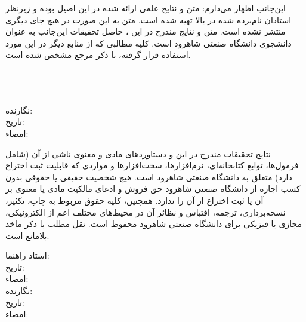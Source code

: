 {\begin{multicols}{2}
\end{multicols}

\vspace{0.2em}
این‌جانب {\ThesisAuthor} اظهار می‌دارم:
 متن و نتایج علمی ارائه شده در این \ThesisType{} اصیل بوده و زیرنظر استادان نام‌برده ‌شده در بالا تهیه شده است.
 متن \ThesisType{} به این صورت در هیچ جای دیگری منتشر نشده است.
 متن و نتایج مندرج در این \ThesisType، حاصل تحقیقات این‌جانب به عنوان دانشجوی \ThesisDegree{} دانشگاه صنعتی شاهرود است.
 کلیه مطالبی که از منابع دیگر در این \ThesisType{} مورد استفاده قرار گرفته، با ذکر مرجع مشخص شده است.

\begin{multicols}{2}
\ \\
\ \\
\ \\

نگارنده: \ThesisAuthor\\
تاریخ: \\
امضاء: \\
\end{multicols}

نتایج تحقیقات مندرج در این \ThesisType{} و دستاوردهای مادی و معنوی ناشی از آن (شامل فرمول‌ها، توابع کتابخانه‌ای، نرم‌افزارها، سخت‌افزارها و مواردی که قابلیت ثبت اختراع دارد) متعلق به دانشگاه صنعتی شاهرود است. هیچ شخصیت حقیقی یا حقوقی بدون کسب اجازه از دانشگاه صنعتی شاهرود حق فروش و ادعای مالکیت مادی یا معنوی بر آن یا ثبت اختراع از آن را ندارد. همچنین، کلیه حقوق مربوط به چاپ، تکثیر، نسخه‌برداری، ترجمه، اقتباس و نظائر آن در محیط‌های مختلف اعم از الکترونیکی، مجازی یا فیزیکی برای دانشگاه صنعتی شاهرود محفوظ است. نقل مطلب با ذکر ماخذ بلامانع است.


\begin{multicols}{2}
استاد راهنما: \ThesisSupervisor \\
تاریخ: \\
امضاء: \\

نگارنده: \ThesisAuthor\\
تاریخ: \\
امضاء: \\
\end{multicols}
}

